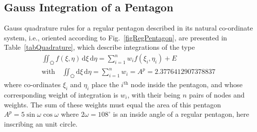 \subsection{Gauss Integration of a Pentagon}

Gauss quadrature rules for a regular pentagon described in its natural co-ordinate system, i.e., oriented according to Fig.~\ref{figRegPentagon}, are presented in Table~\ref{tabQuadrature}, which describe integrations of the type
\begin{multline}
    \iint_{\pentagon} f ( \xi , \eta) \, \mathrm{d} \xi \, \mathrm{d} \eta = 
    \sum_{i=1}^n w_i f ( \xi_i , \eta_i ) + E \\
    \text{with} \quad
    \iint_{\pentagon} \mathrm{d} \xi \, \mathrm{d} \eta = \sum_{i=1}^n w_i =
    A^p = 2.3776412907378837 
\end{multline}
where co-ordinates $\xi_i$ and $\eta_i$ place the $i^{\text{th}}$ node inside the pentagon, and whose corresponding weight of integration is $w_i$, with their being $n$ pairs of nodes and weights.  The sum of these weights must equal the area of this pentagon $A^p = 5 \sin \omega \cos \omega$ where $2 \omega = 108^{\circ}$ is an inside angle of a regular pentagon, here inscribing an unit circle. 

